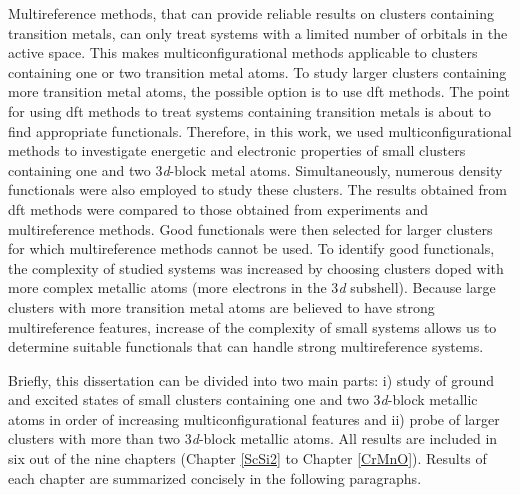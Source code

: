 \begin{refsection}

Multireference methods, that can provide reliable results on clusters containing transition metals, can only treat systems with a limited number of orbitals in the active space. This makes multiconfigurational methods applicable to clusters containing one or two transition metal atoms. To study larger clusters containing more transition metal atoms, the possible option is to use \acrshort{dft} methods. The point for using \acrshort{dft} methods to treat systems containing transition metals is about to find appropriate functionals. Therefore, in this work, we used multiconfigurational methods to investigate energetic and electronic properties of small clusters containing one and two 3\textit{d}-block metal atoms. Simultaneously, numerous density functionals were also employed to study these clusters. The results obtained from \acrshort{dft} methods were compared to those obtained from experiments and multireference methods. Good functionals were then selected for larger clusters for which multireference methods cannot be used. To identify good functionals, the complexity of studied systems was increased by choosing clusters doped with more complex metallic atoms (more electrons in the 3\textit{d} subshell). Because large clusters with more transition metal atoms are believed to have strong multireference features, increase of the complexity of small systems allows us to determine suitable functionals that can handle strong multireference systems. 


Briefly, this dissertation can be divided into two main parts: i) study of ground and excited states of small clusters containing one and two 3\textit{d}-block metallic atoms in order of increasing multiconfigurational features and ii) probe of larger clusters with more than two 3\textit{d}-block metallic atoms. All results are included in six out of the nine chapters (Chapter \ref{ScSi2} to Chapter \ref{CrMnO}). Results of each chapter are summarized concisely in the following paragraphs. 



\end{refsection}
